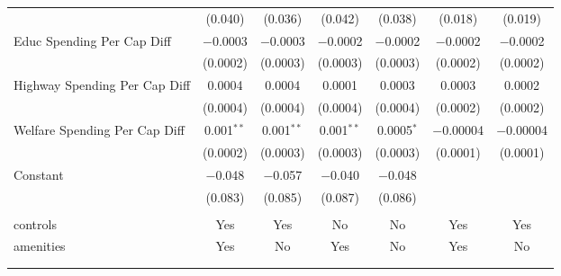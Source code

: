 \begin{table}[!htbp]
\begin{tabular}{@{\extracolsep{5pt}}lcccccc}
  & (0.040) & (0.036) & (0.042) & (0.038) & (0.018) & (0.019) \\ 
  Educ Spending Per Cap Diff & $-$0.0003 & $-$0.0003 & $-$0.0002 & $-$0.0002 & $-$0.0002 & $-$0.0002 \\ 
  & (0.0002) & (0.0003) & (0.0003) & (0.0003) & (0.0002) & (0.0002) \\ 
  Highway Spending Per Cap Diff & 0.0004 & 0.0004 & 0.0001 & 0.0003 & 0.0003 & 0.0002 \\ 
  & (0.0004) & (0.0004) & (0.0004) & (0.0004) & (0.0002) & (0.0002) \\ 
  Welfare Spending Per Cap Diff & 0.001$^{**}$ & 0.001$^{**}$ & 0.001$^{**}$ & 0.0005$^{*}$ & $-$0.00004 & $-$0.00004 \\ 
  & (0.0002) & (0.0003) & (0.0003) & (0.0003) & (0.0001) & (0.0001) \\ 
  Constant & $-$0.048 & $-$0.057 & $-$0.040 & $-$0.048 &  &  \\ 
  & (0.083) & (0.085) & (0.087) & (0.086) &  &  \\ 
 \hline \\[-1.8ex] 
controls & Yes & Yes & No & No & Yes & Yes \\ 
amenities & Yes & No & Yes & No & Yes & No \\ 
\hline \\[-1.8ex] 
\hline 
\hline \\[-1.8ex] 
\end{tabular} 
\end{table} 

